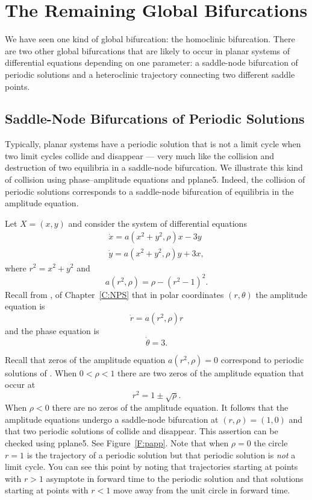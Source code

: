 \documentclass{ximera}
\begin{document}
\section{The Remaining Global Bifurcations} 
\label{S:GlobalBif}

We have seen one kind of global bifurcation: the homoclinic bifurcation. 
There are two other global bifurcations that are likely to occur in planar 
systems of differential equations depending on one parameter:  a saddle-node
bifurcation of periodic solutions and a heteroclinic trajectory connecting two
different saddle points.

\subsection*{Saddle-Node Bifurcations of Periodic Solutions}

Typically, planar systems have a periodic solution that is not a limit cycle 
when two limit cycles collide and disappear --- very much like the collision 
and destruction of two equilibria in a saddle-node bifurcation.  We illustrate 
this kind of collision using phase--amplitude equations and {\sf pplane5}.
Indeed, the collision of periodic solutions corresponds to a saddle-node 
bifurcation of equilibria in the amplitude equation.

Let $X=(x,y)$ and consider the system of differential equations 
\begin{equation*}  \label{e:papp}
\begin{array}{rcl}
\dot{x} = a(x^2+y^2,\rho)x - 3y \\
\dot{y} = a(x^2+y^2,\rho)y + 3x,
\end{array}
\end{equation*}
where $r^2=x^2+y^2$ and
\begin{equation}  \label{e:app}  
a(r^2,\rho) = \rho - (r^2-1)^2.
\end{equation} 
Recall from , of Chapter~\ref{C:NPS}
that in polar coordinates $(r,\theta)$ the 
amplitude equation is 
\[
\dot{r} = a(r^2,\rho)r
\]
and the phase equation is
\[
\dot{\theta} = 3.
\]

Recall that zeros of the amplitude equation $a(r^2,\rho)=0$ correspond to 
periodic solutions of .  When $0<\rho<1$ there are two zeros of 
the amplitude equation  that occur at 
\[
r^2 = 1 \pm\sqrt{\rho}.
\]
When $\rho<0$ there are no zeros of the amplitude equation.  
It follows that the amplitude equations undergo a saddle-node 
bifurcation at $(r,\rho)=(1,0)$ and that two periodic solutions of 
 collide and disappear.  This assertion can be 
checked using {\sf pplane5}.  
See Figure~\ref{F:papp}. Note that when $\rho=0$
the circle $r=1$ is the trajectory of a periodic solution but that periodic 
solution is {\em not\/} a limit cycle.  You can see this point by noting that 
trajectories starting at points with $r>1$ asymptote in forward time to the 
periodic solution and that solutions starting at points with $r<1$ move away 
from the unit circle in forward time.  
\end{document}
